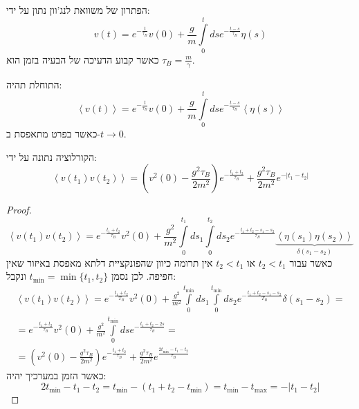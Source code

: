 \documentclass{tstextbook}
\begin{document}
\begin{proposition}
הפתרון של משוואת לנג'וון נתון על ידי:
$$v\left(t\right)=e^{-\frac t{\tau_{B}}}v\left(0\right)+\frac g m\int\limits_{0}^{t}d s e^{-\frac{t-s}{\tau_{B}}}\eta\left(s\right)$$
כאשר קבוע הדעיכה של הבעיה בזמן הוא \(\tau_{B}=\frac{m}{\gamma}\).

\end{proposition}
\begin{corollary}
התוחלת תהיה:
$$\left\langle v\left(t\right)\right\rangle=e^{-\frac t{\tau_{B}}}v\left(0\right)+\frac g m\int\limits_{0}^{t}d s e^{-\frac{t-s}{\tau_{B}}}\left\langle\eta\left(s\right)\right\rangle$$
כאשר בפרט מתאפסת ב-\(t\to 0\).

\end{corollary}
\begin{proposition}
הקורלוציה נתונה על ידי:
$$\left\langle v\left(t_{1}\right)v\left(t_{2}\right)\right\rangle=\left(v^{2}\left(0\right)-\frac{g^{2}\tau_{B}}{2m^{2}}\right)e^{-\frac{t_{1}+t_{2}}{\tau_{B}}}+\frac{g^{2}\tau_{B}}{2m^{2}}e^{-\lvert t_{1}-t_{2} \rvert }$$

\end{proposition}
\begin{proof}
$$\left\langle v\left(t_{1}\right)v\left(t_{2}\right)\right\rangle=e^{-{\frac{t_{1}+t_{2}}{\tau_{B}}}}v^{2}\left(0\right)+{\frac{g^{2}}{m^{2}}}\int\limits_{0}^{t_{1}}d s_{1}\int\limits_{0}^{t_{2}}d s_{2}e^{-{\frac{t_{1}+t_{2}-s_{1}-s_{2}}{\tau_{B}}}}\underbrace{\left\langle\eta\left(s_{1}\right)\eta\left(s_{2}\right)\right\rangle}_{\delta\left(s_{1}-s_{2}\right)}$$
כאשר עבור \(t_{2}<t_{1}\) או \(t_{2}<t_{1}\) אין תרומה כיוון שהפונקציית דלתא מאפסת באיזור שאין חפיפה. לכן נסמן \(t_{\min}=\min\{ t_{1},t_{2} \}\) ונקבל:
\begin{gather*}\left\langle v\left(t_{1}\right)v\left(t_{2}\right)\right\rangle=e^{-{\frac{t_{1}+t_{2}}{T_{B}}}}v^{2}\left(0\right)+{\frac{g^{2}}{m^{2}}}\int\limits_{0}^{t_{\mathrm{min}}}\!d s_{1}\int\limits_{0}^{t_{\mathrm{min}}}\!d s_{2}e^{-{\frac{t_{1}+t_{2}-s_{1}-s_{2}}{T_{B}}}}\delta\left(s_{1}-s_{2}\right) = \\=e^{-\frac{t_{1}+t_{2}}{\tau_{B}}}v^{2}\left(0\right)+\frac{g^{2}}{m^{2}}\int\limits_{0}^{t_{\mathrm{min}}}d s e^{-\frac{t_{1}+t_{2}-2s}{\tau_{B}}}= \\=\left(v^{2}\left(0\right)-\frac{g^{2}\tau_{B}}{2m^{2}}\right)e^{-\frac{t_{1}+t_{2}}{\tau_{B}}}+\frac{g^{2}\tau_{B}}{2m^{2}}e^{\frac{2t_{\mathrm{min}}-t_{1}-t_{2}}{\tau_{B}}}
\end{gather*}
כאשר הזמן במערכיך יהיה:
$$2t_{\mathrm{min}}-t_{1}-t_{2}=t_{\min }-\left( t_{1}+t_{2}-t_{\min } \right)=t_{\mathrm{min}}-t_{\mathrm{max}}=-\left|t_{1}-t_{2}\right|$$

\end{proof}
\end{document}
